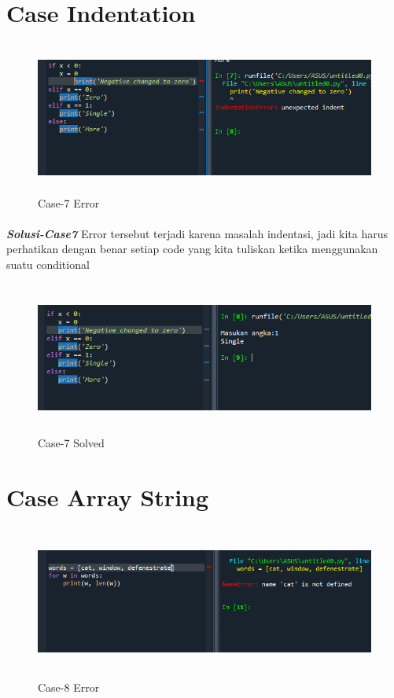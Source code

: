 \documentclass[12pt,a4paper]{article}
\begin{document}
\newpage
\section{Case Indentation}
\begin{figure}[ht]
    \centerline{\includegraphics[width=15cm,height=5cm]{image/case7.png}}
    \renewcommand{\figurename}{Gambar}
    \caption{Case-7 Error}
\end{figure}
\paragraph{}\textbf{\textit{Solusi-Case7}} {Error tersebut terjadi karena masalah indentasi, jadi kita harus perhatikan dengan benar setiap code yang kita tuliskan ketika menggunakan suatu conditional}
\begin{figure}[ht]
    \centerline{\includegraphics[width=15cm,height=5cm]{image/case7-solved.png}}
    \renewcommand{\figurename}{Gambar}
    \caption{Case-7 Solved}
\end{figure}

\newpage
\section{Case Array String}
\begin{figure}[ht]
    \centerline{\includegraphics[width=15cm,height=5cm]{image/case8.png}}
    \renewcommand{\figurename}{Gambar}
    \caption{Case-8 Error}
\end{figure}
\end{document}
